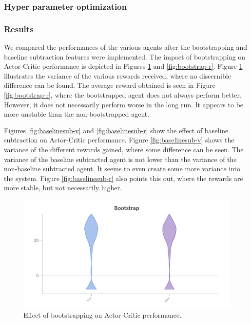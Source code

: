 \documentclass{article}
\begin{document}
\subsubsection{Hyper parameter optimization}
\label{AC-HPO}

\subsubsection{Results}
\label{AC-Results}

We compared the performances of the various agents after the bootstrapping and baseline subtraction features were implemented.
The impact of bootstrapping on Actor-Critic performance is depicted in Figures \ref{fig:bootstrap-v} and \ref{fig:bootstrap-r}.
Figure \ref{fig:bootstrap-v} illustrates the variance of the various rewards received, where no discernible difference can be found.
The average reward obtained is seen in Figure \ref{fig:bootstrap-r}, where the bootstrapped agent does not always perform better.
However, it does not necessarily perform worse in the long run. It appears to be more unstable than the non-bootstrapped agent.

Figures \ref{fig:baselinesub-v} and \ref{fig:baselinesub-r} show the effect of baseline subtraction on Actor-Critic performance.
Figure \ref{fig:baselinesub-v} shows the variance of the different rewards gained, where some difference can be seen.
The variance of the baseline subtracted agent is not lower than the variance of the non-baseline subtracted agent.
It seems to even create some more variance into the system.
Figure \ref{fig:baselinesub-r} also points this out, where the rewards are more stable, but not necessarily higher.

\begin{figure}[htbp]
    \centering
    \includegraphics[width=\linewidth]{figs/bootstrap-V.png}
    \caption{Effect of bootstrapping on Actor-Critic performance.}
    \label{fig:bootstrap-v}
\end{figure}
\end{document}
